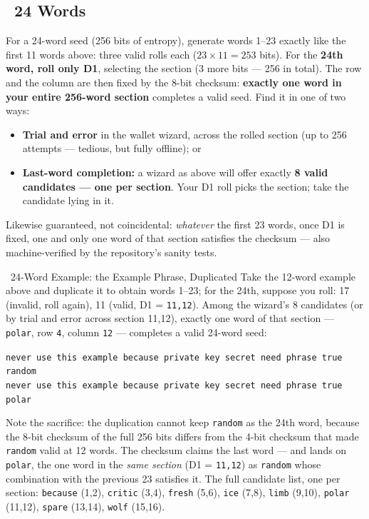 \documentclass[10pt]{article}
\begin{document}
\subsection*{\faLayerGroup~24 Words}

For a 24-word seed (256 bits of entropy), generate words 1--23 exactly like the first 11 words above: three valid rolls each ($23\times11=253$ bits). For the \textbf{24th word, roll only D1}, selecting the section (3 more bits --- 256 in total). The row and the column are then fixed by the 8-bit checksum: \textbf{exactly one word in your entire 256-word section} completes a valid seed. Find it in one of two ways:

\begin{itemize}[itemsep=1pt]
 \item \textbf{Trial and error} in the wallet wizard, across the rolled section (up to 256 attempts --- tedious, but fully offline); or
 \item \textbf{Last-word completion:} a wizard as above will offer exactly \textbf{8 valid candidates --- one per section}. Your D1 roll picks the section; take the candidate lying in it.
\end{itemize}

Likewise guaranteed, not coincidental: \emph{whatever} the first 23 words, once D1 is fixed, one and only one word of that section satisfies the checksum --- also machine-verified by the repository's sanity tests.

\begin{examplebox}{\faLightbulb~24-Word Example: the Example Phrase, Duplicated}
Take the 12-word example above and duplicate it to obtain words 1--23; for the 24th, suppose you roll: 17 (invalid, roll again), 11 (valid, D1 = \texttt{11,12}). Among the wizard's 8 candidates (or by trial and error across section 11,12), exactly one word of that section --- \texttt{polar}, row \texttt{4}, column \texttt{12} --- completes a valid 24-word seed:

\vspace{0.5em}
\texttt{never use this example because private key secret need phrase true random}\\
\texttt{never use this example because private key secret need phrase true polar}~\faCheckCircle
\vspace{0.5em}

Note the sacrifice: the duplication cannot keep \texttt{random} as the 24th word, because the 8-bit checksum of the full 256 bits differs from the 4-bit checksum that made \texttt{random} valid at 12 words. The checksum claims the last word --- and lands on \texttt{polar}, the one word in the \emph{same section} (D1 = \texttt{11,12}) as \texttt{random} whose combination with the previous 23 satisfies it. The full candidate list, one per section: \texttt{because} (1,2), \texttt{critic} (3,4), \texttt{fresh} (5,6), \texttt{ice} (7,8), \texttt{limb} (9,10), \texttt{polar} (11,12), \texttt{spare} (13,14), \texttt{wolf} (15,16).
\end{examplebox}
\end{document}
